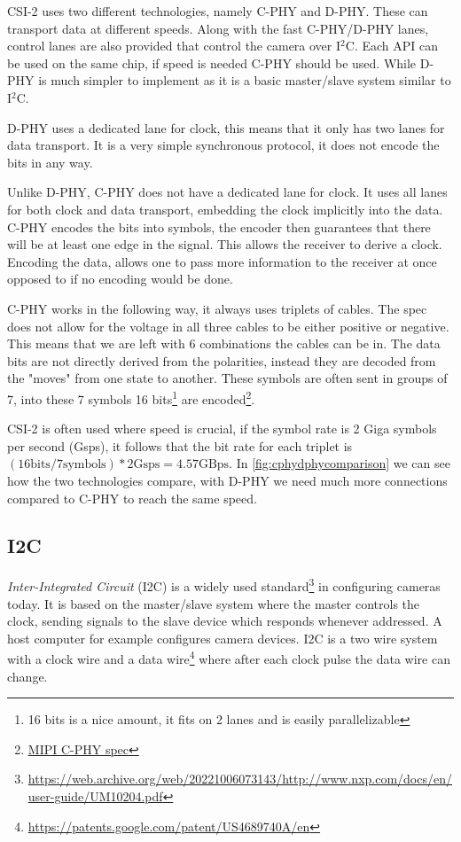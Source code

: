 CSI-2 uses two different technologies, namely C-PHY and D-PHY. These can
transport data at different speeds. Along with the fast C-PHY/D-PHY lanes,
control lanes are also provided that control the camera over I$^2$C. Each API
can be used on the same chip, if speed is needed C-PHY should be used. While
D-PHY is much simpler to implement as it is a basic master/slave system similar
to I$^2$C.

D-PHY uses a dedicated lane for clock, this means that it only has two lanes for
data transport. It is a very simple synchronous protocol, it does not encode the
bits in any way.

Unlike D-PHY, C-PHY does not have a dedicated lane for clock. It uses all lanes
for both clock and data transport, embedding the clock implicitly into the
data. C-PHY encodes the bits into symbols, the encoder then guarantees that
there will be at least one edge in the signal. This allows the receiver to
derive a clock. Encoding the data, allows one to pass more information to the
receiver at once opposed to if no encoding would be done.

C-PHY works in the following way, it always uses triplets of cables. The spec
does not allow for the voltage in all three cables to be either positive or
negative. This means that we are left with 6 combinations the cables can be in.
The data bits are not directly derived from the polarities, instead they are
decoded from the "moves" from one state to another. These symbols are often
sent in groups of 7, into these 7 symbols 16 bits\footnote{16 bits is a nice
amount, it fits on 2 lanes and is easily parallelizable} are encoded\footnote{\href{https://www.mipi.org/specifications/c-phy}{MIPI C-PHY spec}}.

CSI-2 is often used where speed is crucial, if the symbol rate is 2 Giga symbols per second (Gsps),
it follows that the bit rate for each triplet is
$(16\text{bits} / 7\text{symbols}) * 2\text{Gsps} = 4.57 \text{GBps}$.
In \cref{fig:cphydphycomparison} we can see how the two technologies compare,
with D-PHY we need much more connections compared to C-PHY to reach the same
speed.

\subsection{I2C}
\textit{Inter-Integrated Circuit} (I2C) is a widely used standard\footnote{\href{http://www.nxp.com/docs/en/user-guide/UM10204.pdf}{https://web.archive.org/web/20221006073143/http://www.nxp.com/docs/en/user-guide/UM10204.pdf}}
in configuring cameras today. It is based on the
master/slave system where the master controls the clock, sending signals to the
slave device which responds whenever addressed. A host computer for example
configures camera devices. I2C is a two wire system with a clock wire and a
data wire\footnote{\href{https://patents.google.com/patent/US4689740A/en}{https://patents.google.com/patent/US4689740A/en}}
where after each clock pulse the data wire can change.

